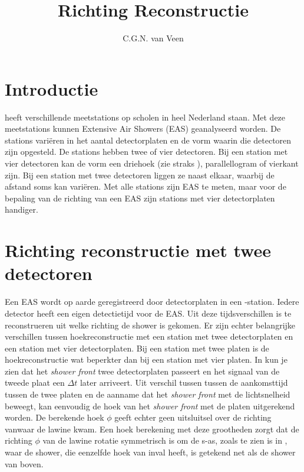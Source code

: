 



\title{Richting Reconstructie}
\author{C.G.N. van Veen} 
\date{}

\maketitle

\section{Introductie}

\hisparc heeft verschillende meetstations op scholen in heel Nederland
staan. Met deze meetstations kunnen Extensive Air Showers (EAS)
geanalyseerd worden. De stations variëren in het aantal detectorplaten
en de vorm waarin die detectoren zijn opgesteld. De stations hebben twee
of vier detectoren. Bij een station met vier detectoren kan de vorm een
driehoek (zie straks ), parallellogram of
vierkant zijn. Bij een station met twee detectoren liggen ze naast
elkaar, waarbij de afstand soms kan variëren. Met alle stations zijn EAS
te meten, maar voor de bepaling van de richting van een EAS zijn
stations met vier detectorplaten handiger.


\section{Richting reconstructie met twee detectoren}

Een EAS wordt op aarde geregistreerd door detectorplaten in een
\hisparc-station. Iedere detector heeft een eigen detectietijd voor de
EAS. Uit deze tijdsverschillen is te reconstrueren uit welke richting de
shower is gekomen. Er zijn echter belangrijke verschillen tussen
hoekreconstructie met een station met twee detectorplaten en een station
met vier detectorplaten. Bij een station met twee platen is de
hoekreconstructie wat beperkter dan bij een station met vier platen. In
 kun je zien dat het \emph{shower front} twee
detectorplaten passeert en het signaal van de tweede plaat een $\Delta t$
later arriveert. Uit verschil tussen tussen de aankomsttijd tussen de
twee platen en de aanname dat het \emph{shower front} met de
lichtsnelheid beweegt, kan eenvoudig de hoek van het \emph{shower front}
met de platen uitgerekend worden. De berekende hoek $\phi$ geeft echter
geen uitsluitsel over de richting vanwaar de lawine kwam. Een hoek
berekening met deze grootheden zorgt dat de richting $\phi$ van de
lawine rotatie symmetrisch is om de s-as, zoals te zien is in
, waar de shower, die eenzelfde hoek van inval
heeft, is getekend net als de shower van boven. 

